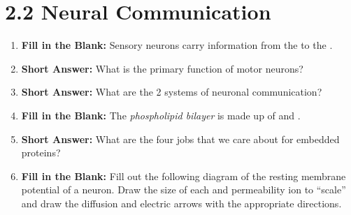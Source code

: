 
\section*{2.2 Neural Communication}

\begin{enumerate}[label=\textbf{Q2.2.\arabic*}]
      \item \textbf{Fill in the Blank:} Sensory neurons carry information from the \underline{\hspace{3cm}} to the \underline{\hspace{3cm}}. \\

      \item \textbf{Short Answer:} What is the primary function of motor neurons? \\

      \item \textbf{Short Answer:} What are the 2 systems of neuronal communication?

      \item \textbf{Fill in the Blank:} The \textit{phospholipid bilayer} is made up of \underline{\hspace{3cm}} and \underline{\hspace{3cm}}. \\

      \item \textbf{Short Answer:} What are the four jobs that we care about for embedded proteins? \\

            \newpage

      \item \textbf{Fill in the Blank:} Fill out the following diagram of the resting membrane potential of a neuron. Draw the size of each and permeability ion to ``scale'' and draw the diffusion and electric arrows with the appropriate directions. \\

\end{enumerate}
